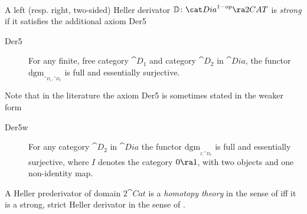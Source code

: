 \begin{defn}
\label{defn:hellerstrongderivator}
\mbox{} \\
A left (resp. right, two-sided) Heller derivator ${\mathbb D} \colon {\cat Dia}^{1-op} \ra  2CAT$ is {\it strong} if it satisfies the additional axiom Der5
\begin{description}
\item[Der5]
For any finite, free category ${\cat D}_1$ and category ${\cat D}_2$ in ${\cat Dia}$, the functor $\mathrm{dgm}_{_{{\cat D}_1, {\cat D}_2}}$ is full and essentially surjective.
\end{description}
\end{defn}

Note that in the literature the axiom Der5 is sometimes stated in the weaker form
\begin{description}
\item[Der5w]
For any category ${\cat D}_2$ in ${\cat Dia}$ the functor $\mathrm{dgm}_{_{I, {\cat D}_2}}$ is full and essentially surjective, where $I$ denotes the category $0 \ra 1$, with two objects and one non-identity map.
\end{description}


\begin{thm}
\label{thm:hellerderishtpytheory}
A Heller prederivator of domain $2{\cat Cat}$ is a {\it homotopy theory} in the sense of \cite{Heller} iff it is a strong, strict Heller derivator in the sense of .
\end{thm}

